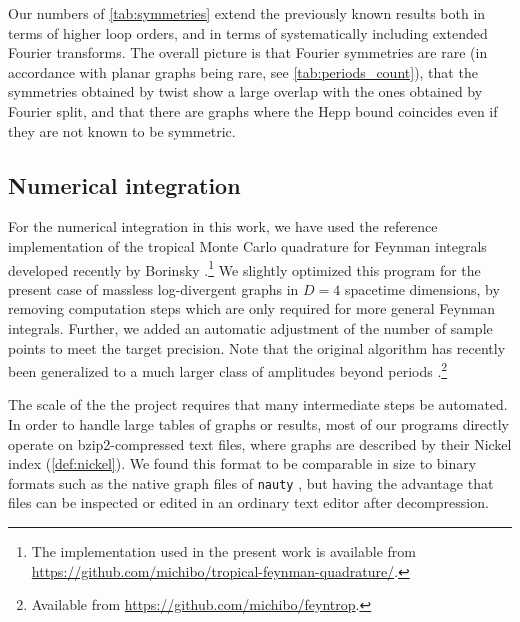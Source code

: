 \documentclass[11pt,a4paper]{article}
\renewcommand{\|}{\rule[-0.4ex]{0.2ex}{1.2em}}
\begin{document}
Our numbers of \cref{tab:symmetries} extend the previously known results both in terms of higher loop orders, and in terms of systematically  including extended Fourier transforms. The overall picture is that Fourier symmetries are rare (in accordance with planar graphs being rare, see \cref{tab:periods_count}), that the symmetries obtained by twist show a large overlap with the ones obtained by Fourier split, and that there are graphs where the Hepp bound coincides even if they are not known to be symmetric. 









\subsection{Numerical integration}\label{sec:numerical_integration}

For the  numerical integration in this work, we have used the reference implementation of the tropical Monte Carlo quadrature for Feynman integrals developed recently by Borinsky \cite{borinsky_tropical_2023a}.\footnote{The implementation used in the present work is  available from \url{https://github.com/michibo/tropical-feynman-quadrature/}.} We slightly optimized this program for the present case of massless log-divergent graphs in $D=4$ spacetime dimensions, by removing computation steps which are only required for more general Feynman integrals. Further,  we added an automatic adjustment of the number of sample points to meet the target precision. Note that the original algorithm has recently been generalized to a much larger class of amplitudes beyond periods \cite{borinsky_tropical_2023}.\footnote{Available from \url{https://github.com/michibo/feyntrop}.}

The scale of the the project requires that  many intermediate steps be automated. In order to handle large tables of graphs or results, most of our programs directly operate on bzip2-compressed text files, where graphs are described by their Nickel index (\cref{def:nickel}). We found this format to be comparable in size to binary formats such as the native graph files of \texttt{nauty} \cite{mckay_practical_2014}, but having the advantage that files can be inspected or edited in an ordinary text editor after decompression. 
\end{document}
